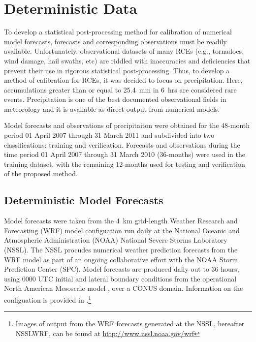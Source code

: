 

\section{Deterministic Data}
\label{ddata}

To develop a statistical post-processing method for calibration of numerical model forecasts, forecasts and corresponding observations must be readily available. Unfortunately, observational datasets of many RCEs (e.g., tornadoes, wind damage, hail swaths, etc) are riddled with inaccuracies and deficiencies \citep{Doswell1988, Weiss2002, Trapp2006, Ortega2009} that prevent their use in rigorous statistical post-processing. Thus, to develop a method of calibration for RCEs, it was decided to focus on precipitation. Here, accumulations greater than or equal to \mbox{25.4 mm} in \mbox{6 hrs} are considered rare events. Precipitation is one of the best documented observational fields in meteorology and it is available as direct output from numerical models.

Model forecasts and observations of precipitaiton were obtained for the 48-month period 01 April 2007 through 31 March 2011 and subdivided into two classifications: training and verification. Forecasts and observations during the time period 01 April 2007 through 31 March 2010 (36-months) were used in the training dataset, with the remaining 12-months used for testing and verification of the proposed method.




\subsection{Deterministic Model Forecasts}
\label{dmodel}

Model forecasts were taken from the \mbox{4 km} grid-length Weather Research and Forecasting (WRF) model configuation \citep{WRFV3} run daily at the National Oceanic and Atmospheric Administration (NOAA) National Severe Storms Laboratory (NSSL). The NSSL procudes numerical weather prediction forecasts from the WRF model as part of an ongoing collaborative effort with the NOAA Storm Prediction Center (SPC). Model forecasts are produced daily out to 36 hours, using 0000 UTC initial and lateral boundary conditions from the operational North American Mesoscale model \citep{NAM}, over a CONUS domain. Information on the configuation is provided in \cite{Kain2010}.\footnote{Images of output from the WRF forecasts generated at the NSSL, hereafter NSSLWRF, can be found at \url{http://www.nssl.noaa.gov/wrf}}




